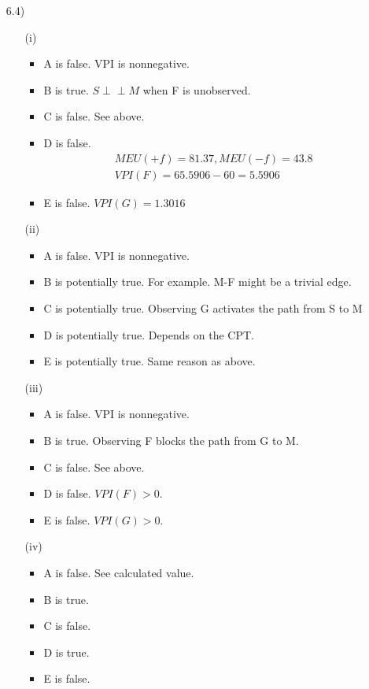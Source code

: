 \documentclass[11pt]{article}
\theoremstyle{definition}
\theoremstyle{remark}
\newcommand{\indep}{\perp \!\!\! \perp}
\begin{document}
\begin{enumerate}
\item[6.4)]
\begin{enumerate}
\item[(i)]
\begin{itemize}
\item A is false. VPI is nonnegative.
\item B is true. $S \indep M$ when F is unobserved.
\item C is false. See above.
\item D is false.
\begin{align*}
MEU(+f) = 81.37,
MEU(-f) = 43.8 \\
VPI(F) = 65.5906 - 60 = 5.5906
\end{align*}
\item E is false. $VPI(G) = 1.3016$
\end{itemize}

\item[(ii)]
\begin{itemize}
\item A is false. VPI is nonnegative.
\item B is potentially true. For example. M-F might be a trivial edge.
\item C is potentially true. Observing G activates the path from S to M
\item D is potentially true. Depends on the CPT.
\item E is potentially true. Same reason as above.
\end{itemize}

\item[(iii)]
\begin{itemize}
\item A is false. VPI is nonnegative.
\item B is true. Observing F blocks the path from G to M.
\item C is false. See above.
\item D is false. $VPI(F)>0$.
\item E is false. $VPI(G)>0$.
\end{itemize}

\item[(iv)]
\begin{itemize}
\item A is false. See calculated value.
\item B is true.
\item C is false.
\item D is true.
\item E is false.
\end{itemize}
\end{enumerate}


\end{enumerate}
\end{document}

